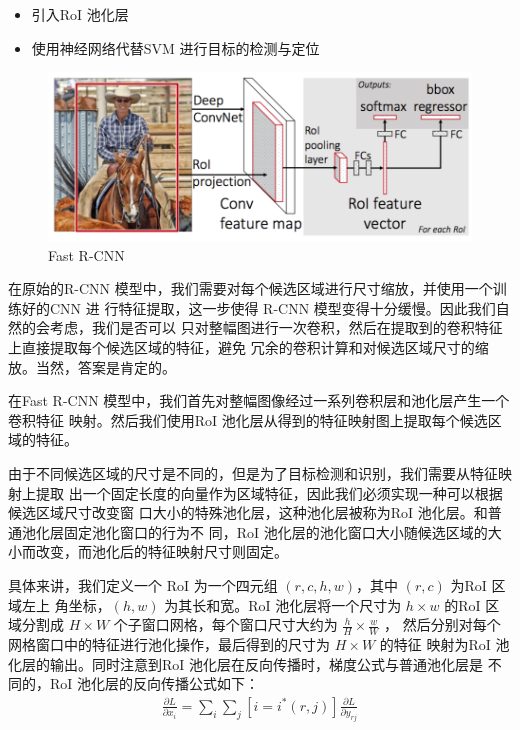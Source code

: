 \begin{itemize}
  \item 引入RoI 池化层
  \item 使用神经网络代替SVM 进行目标的检测与定位
\end{itemize}

\begin{figure}
  \centering
  \includegraphics[width=1.0\linewidth]{./Figure/FastRCNN.png}
  \caption{Fast R-CNN\cite{Girshick:2015ib}}\label{Fig:FastRCNN}
\end{figure}

在原始的R-CNN 模型中，我们需要对每个候选区域进行尺寸缩放，并使用一个训练好的CNN 进
行特征提取，这一步使得 R-CNN 模型变得十分缓慢。因此我们自然的会考虑，我们是否可以
只对整幅图进行一次卷积，然后在提取到的卷积特征上直接提取每个候选区域的特征，避免
冗余的卷积计算和对候选区域尺寸的缩放。当然，答案是肯定的。

在Fast R-CNN 模型中，我们首先对整幅图像经过一系列卷积层和池化层产生一个卷积特征
映射。然后我们使用RoI 池化层从得到的特征映射图上提取每个候选区域的特征。

由于不同候选区域的尺寸是不同的，但是为了目标检测和识别，我们需要从特征映射上提取
出一个固定长度的向量作为区域特征，因此我们必须实现一种可以根据候选区域尺寸改变窗
口大小的特殊池化层，这种池化层被称为RoI 池化层。和普通池化层固定池化窗口的行为不
同，RoI 池化层的池化窗口大小随候选区域的大小而改变，而池化后的特征映射尺寸则固定。


具体来讲，我们定义一个 RoI 为一个四元组 $(r,c,h,w)$，其中 $(r,c)$ 为RoI 区域左上
角坐标，$(h, w)$ 为其长和宽。RoI 池化层将一个尺寸为 $h \times w$ 的RoI 区域分割成
$H \times W$ 个子窗口网格，每个窗口尺寸大约为 $\frac{h}{H} \times \frac{w}{W}$ ，
然后分别对每个网格窗口中的特征进行池化操作，最后得到的尺寸为 $H \times W$ 的特征
映射为RoI 池化层的输出。同时注意到RoI 池化层在反向传播时，梯度公式与普通池化层是
不同的，RoI 池化层的反向传播公式如下：
\begin{equation}
\begin{aligned}
\frac{\partial L}{\partial x_i} = \sum_{i}\sum_{j}[i = i^*(r,j)]\frac{\partial
  L}{\partial y_{rj}}
\end{aligned}
\end{equation}

